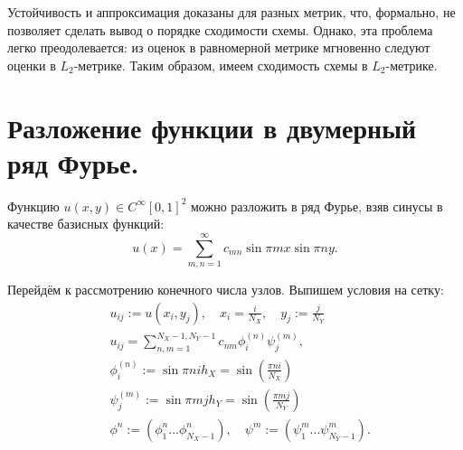 \documentclass[14pt,a4paper]{extarticle}
\newcommand{\1}{\mathbbm{1}}
\begin{document}
Устойчивость и аппроксимация доказаны для разных метрик, что, формально, 
не позволяет сделать вывод о порядке сходимости схемы. Однако, эта проблема
легко преодолевается: из оценок в равномерной метрике мгновенно следуют оценки 
в $L_2$-метрике. Таким образом, имеем сходимость схемы в $L_2$-метрике.

\section{Разложение функции в двумерный ряд Фурье.}
Функцию $u(x, y) \in C^{\infty}[0, 1]^2$ можно разложить в ряд Фурье,
взяв синусы в качестве базисных функций:
\begin{equation*}
    u(x) = \sum_{m, n = 1}^{\infty} c_{mn} \sin {\pi m x} \sin {\pi n y}.
\end{equation*}
\par
Перейдём к рассмотрению конечного числа узлов. Выпишем условия на сетку:
\begin{align*}
     & u_{ij} := u(x_i, y_j), \quad x_i = \frac{i}{N_X}, \quad y_j := \frac{j}{N_Y}\\
     & u_{ij} = \sum_{n, m = 1}^{N_X-1, N_Y-1} c_{nm} \phi_i^{(n)} \psi_j^{(m)},                                    \\
     & \phi_i^{(n)} := \sin{\pi n i h_X} = \sin\left(\frac{\pi n i}{N_X}\right) \\
     & \psi_j^{(m)} := \sin{\pi m j h_Y} = \sin\left(\frac{\pi m j}{N_Y}\right) \\
     & \phi^n := (\phi_1^n ... \phi_{N_X-1}^n), \quad \psi^m := (\psi_1^m ... \psi_{N_Y-1}^m).
\end{align*}


\end{document}
